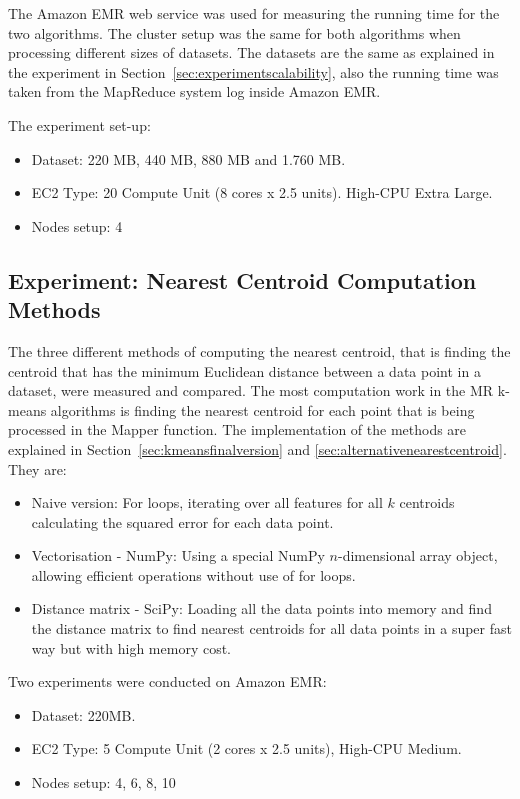 The Amazon EMR web service was used for measuring the running time for the two algorithms. The cluster setup was the same for both algorithms when processing different sizes of datasets. The datasets are the same as explained in the experiment in Section~\ref{sec:experimentscalability}, also the running time was taken from the MapReduce system log inside Amazon EMR.

The experiment set-up:
\begin{itemize}
	\item Dataset: 220 MB, 440 MB, 880 MB and 1.760 MB.
	\item EC2 Type: 20 Compute Unit (8 cores x 2.5 units). High-CPU Extra Large.
	\item Nodes setup: 4
\end{itemize}


\subsection{Experiment: Nearest Centroid Computation Methods}
The three different methods of computing the nearest centroid, that is finding the centroid that has the minimum Euclidean distance between a data point in a dataset, were measured and compared. The most computation work in the MR k-means algorithms is finding the nearest centroid for each point that is being processed in the Mapper function. The implementation of the methods are explained in Section~\ref{sec:kmeansfinalversion} and \ref{sec:alternativenearestcentroid}. They are:

\begin{itemize}
\item Naive version: For loops, iterating over all features for all $k$ centroids calculating the squared error for each data point. 
\item Vectorisation - NumPy: Using a special NumPy $n$-dimensional array object, allowing efficient operations without use of for loops.
\item Distance matrix - SciPy: Loading all the data points into memory and find the distance matrix to find nearest centroids for all data points in a super fast way but with high memory cost.
\end{itemize}

Two experiments were conducted on Amazon EMR:
\begin{itemize}
	\item Dataset: 220MB.
	\item EC2 Type: 5 Compute Unit (2 cores x 2.5 units), High-CPU Medium.
	\item Nodes setup: 4, 6, 8, 10
\end{itemize}

